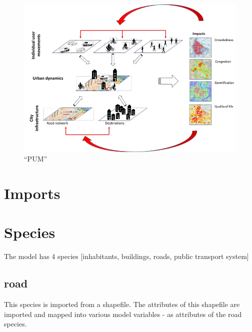 \documentclass[]{book}
\theoremstyle{definition}
\theoremstyle{definition}
\theoremstyle{definition}
\theoremstyle{remark}
\begin{document}
\begin{figure}
\centering
\includegraphics{images/scheme.png}
\caption{``PUM''}
\end{figure}

\hypertarget{imports}{%
\chapter{Imports}\label{imports}}

\hypertarget{species}{%
\chapter{Species}\label{species}}

The model has 4 species {[}inhabitants, buildings, roads, public
transport system{]}

\hypertarget{road}{%
\section{road}\label{road}}

This species is imported from a shapefile. The attributes of this
shapefile are imported and mapped into various model variables - as
attributes of the road species.
\end{document}
